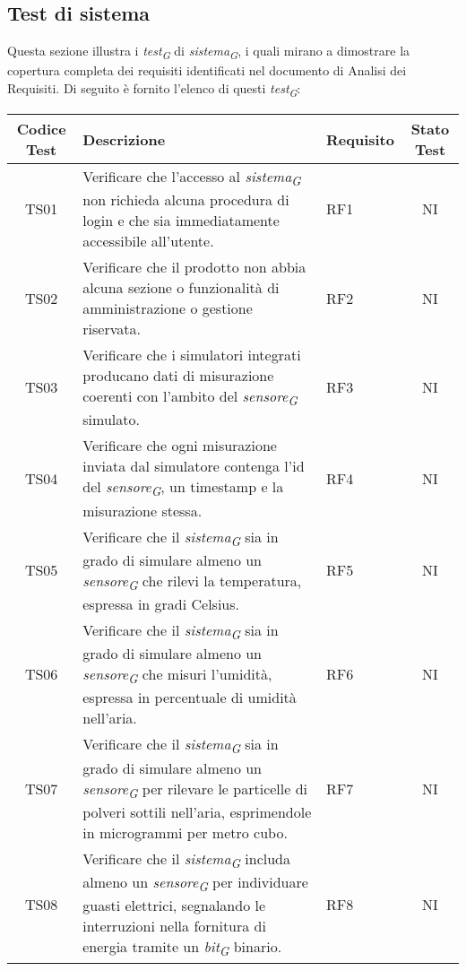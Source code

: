 \subsection{Test di sistema}
Questa sezione illustra i \textit{test}\textsubscript{\textit{G}} di \textit{sistema}\textsubscript{\textit{G}}, i quali mirano a dimostrare la copertura completa dei requisiti identificati nel documento di Analisi dei Requisiti. Di seguito è fornito l'elenco di questi \textit{test}\textsubscript{\textit{G}}:
\\
\begin{longtable}{|c|p{5cm}|>{\raggedright}p{2cm}|c|}
        \hline
        Codice Test & Descrizione & Requisito & Stato Test \\
        \hline
        TS01 & Verificare che l'accesso al \textit{sistema}\textsubscript{\textit{G}} non richieda alcuna procedura di login e che sia immediatamente accessibile all'utente. & RF1 & NI \\
        \hline
        TS02 & Verificare che il prodotto non abbia alcuna sezione o funzionalità di amministrazione o gestione riservata. & RF2 & NI \\
        \hline
        TS03 & Verificare che i simulatori integrati producano dati di misurazione coerenti con l'ambito del \textit{sensore}\textsubscript{\textit{G}} simulato. & RF3 & NI \\
        \hline
        TS04 & Verificare che ogni misurazione inviata dal simulatore contenga l'id del \textit{sensore}\textsubscript{\textit{G}}, un timestamp e la misurazione stessa. & RF4 & NI \\
        \hline
        TS05 & Verificare che il \textit{sistema}\textsubscript{\textit{G}} sia in grado di simulare almeno un \textit{sensore}\textsubscript{\textit{G}} che rilevi la temperatura, espressa in gradi Celsius. & RF5 & NI \\
        \hline
        TS06 & Verificare che il \textit{sistema}\textsubscript{\textit{G}} sia in grado di simulare almeno un \textit{sensore}\textsubscript{\textit{G}} che misuri l'umidità, espressa in percentuale di umidità nell'aria.
        & RF6 & NI \\
        \hline
        TS07 & Verificare che il \textit{sistema}\textsubscript{\textit{G}} sia in grado di simulare almeno un \textit{sensore}\textsubscript{\textit{G}} per rilevare le particelle di polveri sottili nell'aria, esprimendole in microgrammi per metro cubo. & RF7 & NI \\
        \hline
        TS08 & Verificare che il \textit{sistema}\textsubscript{\textit{G}} includa almeno un \textit{sensore}\textsubscript{\textit{G}} per individuare guasti elettrici, segnalando le interruzioni nella fornitura di energia tramite un \textit{bit}\textsubscript{\textit{G}} binario. & RF8 & NI \\

\end{longtable}
